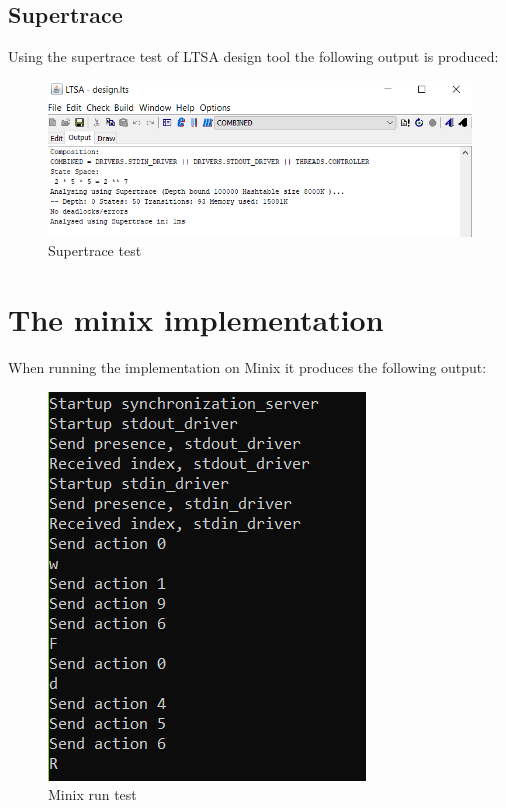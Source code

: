 \hypertarget{supertrace}{%
\subsection{Supertrace}\label{supertrace}}

Using the supertrace test of LTSA design tool the following output is
produced:

\begin{figure}
\centering
\includegraphics{../img/supertrace.png}
\caption{Supertrace test}
\end{figure}

\hypertarget{the-minix-implementation}{%
\section{The minix implementation}\label{the-minix-implementation}}

When running the implementation on Minix it produces the following
output:

\begin{figure}
\centering
\includegraphics{../img/output.png}
\caption{Minix run test}
\end{figure}

